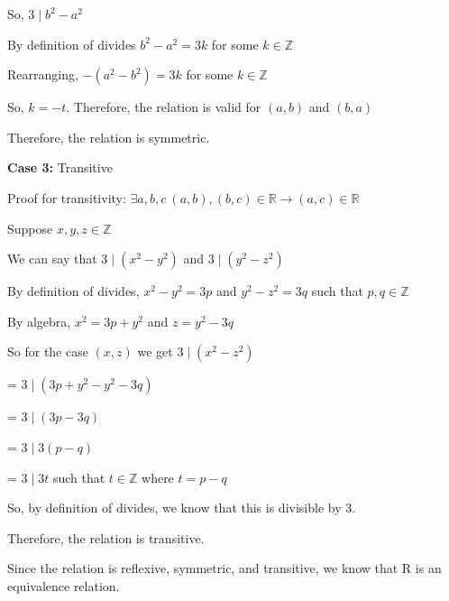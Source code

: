 \documentclass{article} %
\begin{document}
    \tabto{1cm} So, $3 \mid b^2 - a^2$

    \tabto{1cm} By definition of divides $b^2 - a^2 = 3k$ for some $k \in \mathbb{Z}$

    \tabto{1cm} Rearranging, $-(a^2 - b^2) = 3k$ for some $k \in \mathbb{Z}$

    \tabto{1cm} So, $k = -t$. Therefore, the relation is valid for $(a, b)$ and $(b, a)$

    \tabto{1cm} Therefore, the relation is symmetric.

    \textbf{Case 3:} Transitive

    \tabto{1cm} Proof for transitivity: $\exists a, b, c\ (a, b), (b, c) \in \mathbb{R} \rightarrow (a, c) \in \mathbb{R}$

    \tabto{1cm} Suppose $x, y, z \in \mathbb{Z}$

    \tabto{1cm} We can say that $3 \mid (x^2 - y^2)$ and $3 \mid (y^2 - z^2)$

    \tabto{1cm} By definition of divides, $x^2 - y^2 = 3p$ and $y^2 - z^2 = 3q$ such that $p, q \in \mathbb{Z}$

    \tabto{1cm} By algebra, $x^2 = 3p+y^2$ and $z = y^2 - 3q$

    \tabto{1cm} So for the case $(x, z)$ we get $3 \mid (x^2 - z^2)$

    \tabto{5.01cm} = $3 \mid (3p+y^2 - y^2 - 3q)$

    \tabto{5.01cm} = $3 \mid (3p - 3q)$

    \tabto{5.01cm} = $3 \mid 3(p - q)$

    \tabto{5.01cm} = $3 \mid 3t$ such that $t \in \mathbb{Z}$ where $t = p - q$ 

    \tabto{1cm} So, by definition of divides, we know that this is divisible by 3.
    
    \tabto{1cm} Therefore, the relation is transitive.

    Since the relation is reflexive, symmetric, and transitive, we know that R is an equivalence relation.
\end{document}
